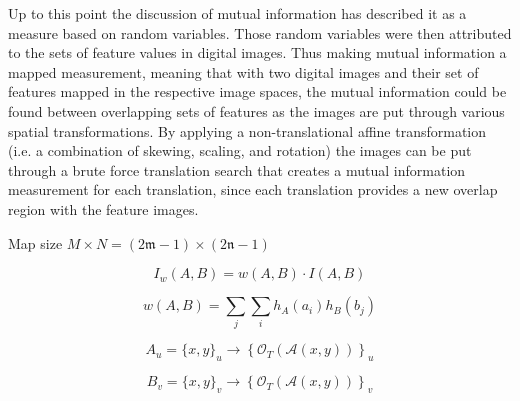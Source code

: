 %
%
%
%
%
%
%
%
%

%
%
%



Up to this point the discussion of mutual information has described it as a measure based on random variables. Those random variables were then attributed to the sets of feature values in digital images. Thus making mutual information a mapped measurement, meaning that with two digital images and their set of features mapped in the respective image spaces, the mutual information could be found between overlapping sets of features as the images are put through various spatial transformations. By applying a non-translational affine transformation (i.e. a combination of skewing, scaling, and rotation) the images can be put through a brute force translation search that creates a mutual information measurement for each translation, since each translation provides a new overlap region with the feature images.

Map size $M \times N = (2\mathfrak{m}-1) \times (2\mathfrak{n}-1)$

\begin{equation}
\label{WeightedInformation}
	I_{w}(A,B)=w(A,B) \cdot I(A,B)
\end{equation}


\begin{equation}
\label{}
w(A,B)=\sum_{j}\sum_{i}{h_{A}(a_{i})h_{B}(b_{j})}
\end{equation}


\begin{equation}
\label{}
A_{u}=\{x,y\}_{u} \rightarrow \left\{ \mathcal{O}_{T}\left(\mathcal{A}(x,y) \right) \right\}_{u} 
\end{equation}


\begin{equation}
\label{}
B_{v}=\{x,y\}_{v} \rightarrow \left\{ \mathcal{O}_{T}\left(\mathcal{A}(x,y) \right) \right\}_{v}
\end{equation}


